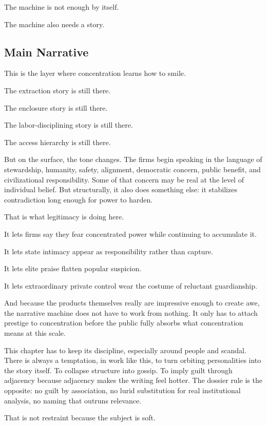 \documentclass[
  american,
  12pt,
  letterpaper,
]{article}
\begin{document}
The machine is not enough by itself.

The machine also needs a story.

\subsection{Main Narrative}\label{main-narrative-8}

This is the layer where concentration learns how to smile.

The extraction story is still there.

The enclosure story is still there.

The labor-disciplining story is still there.

The access hierarchy is still there.

But on the surface, the tone changes. The firms begin speaking in the
language of stewardship, humanity, safety, alignment, democratic
concern, public benefit, and civilizational responsibility. Some of that
concern may be real at the level of individual belief. But structurally,
it also does something else: it stabilizes contradiction long enough for
power to harden.

That is what legitimacy is doing here.

It lets firms say they fear concentrated power while continuing to
accumulate it.

It lets state intimacy appear as responsibility rather than capture.

It lets elite praise flatten popular suspicion.

It lets extraordinary private control wear the costume of reluctant
guardianship.

And because the products themselves really are impressive enough to
create awe, the narrative machine does not have to work from nothing. It
only has to attach prestige to concentration before the public fully
absorbs what concentration means at this scale.

This chapter has to keep its discipline, especially around people and
scandal. There is always a temptation, in work like this, to turn
orbiting personalities into the story itself. To collapse structure into
gossip. To imply guilt through adjacency because adjacency makes the
writing feel hotter. The dossier rule is the opposite: no guilt by
association, no lurid substitution for real institutional analysis, no
naming that outruns relevance.

That is not restraint because the subject is soft.
\end{document}
